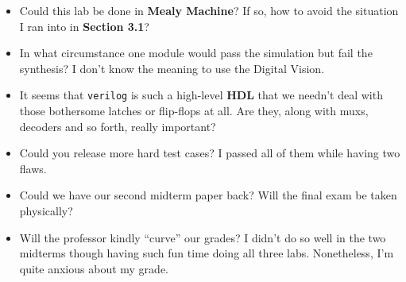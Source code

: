 \documentclass[12pt, a4paper]{article}
\begin{document}
\begin{itemize}
\item Could this lab be done in \textbf{Mealy Machine}? If so, how to avoid the situation I ran into in \textbf{Section 3.1}?
\item In what circumstance one module would pass the simulation but fail the synthesis? I don't know the meaning to use the Digital Vision.
\item It seems that \texttt{verilog} is such a high-level \textbf{HDL} that we needn't deal with those bothersome latches or flip-flops at all.  Are they, along with muxs, decoders and so forth, really important?
\item Could you release more hard test cases? I passed all of them while having two flaws.
\item Could we have our second midterm paper back? Will the final exam be taken physically?
\item Will the professor kindly ``curve'' our grades? I didn't do so well in the two midterms though having such fun time doing all three labs. Nonetheless, I'm quite anxious about my grade.
\end{itemize}
\end{document}
